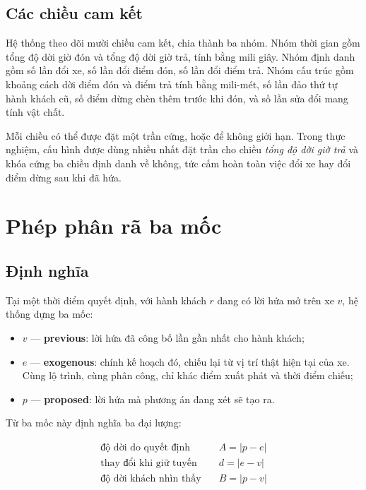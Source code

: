 \subsection{Các chiều cam kết}

Hệ thống theo dõi mười chiều cam kết, chia thành ba nhóm. Nhóm thời gian gồm tổng độ dời giờ
đón và tổng độ dời giờ trả, tính bằng mili giây. Nhóm định danh gồm số lần đổi xe, số lần đổi
điểm đón, số lần đổi điểm trả. Nhóm cấu trúc gồm khoảng cách dời điểm đón và điểm trả tính bằng
mili-mét, số lần đảo thứ tự hành khách cũ, số điểm dừng chèn thêm trước khi đón, và số lần sửa
đổi mang tính vật chất.

Mỗi chiều có thể được đặt một trần cứng, hoặc để không giới hạn. Trong thực nghiệm, cấu hình
được dùng nhiều nhất đặt trần cho chiều \emph{tổng độ dời giờ trả} và khóa cứng ba chiều định
danh về không, tức cấm hoàn toàn việc đổi xe hay đổi điểm dừng sau khi đã hứa.

\section{Phép phân rã ba mốc}
\label{muc:bamoc}

\subsection{Định nghĩa}
\label{muc:dinhnghia-bamoc}

Tại một thời điểm quyết định, với hành khách $r$ đang có lời hứa mở trên xe $v$, hệ thống dựng
ba mốc:

\begin{itemize}[leftmargin=1.2cm,itemsep=2pt,topsep=3pt]
\item $v$ --- \textbf{previous}: lời hứa đã công bố lần gần nhất cho hành khách;
\item $e$ --- \textbf{exogenous}: chính kế hoạch đó, chiếu lại từ vị trí thật hiện tại của xe.
Cùng lộ trình, cùng phân công, chỉ khác điểm xuất phát và thời điểm chiếu;
\item $p$ --- \textbf{proposed}: lời hứa mà phương án đang xét sẽ tạo ra.
\end{itemize}

Từ ba mốc này định nghĩa ba đại lượng:

\begin{align}
\text{độ dời do quyết định} \quad & A = |p - e|\\
\text{thay đổi khi giữ tuyến} \quad & d = |e - v|\\
\text{độ dời khách nhìn thấy} \quad & B = |p - v|
\end{align}

